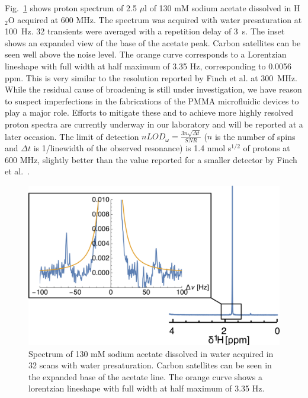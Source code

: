 \documentclass[preprint,5p]{elsarticle}
\newcommand{\fig}[1]{Fig.~\ref{#1}}
\begin{document}

\fig{fig:lineshape} shows proton spectrum of 2.5 $\mu$l of 130 mM  sodium acetate dissolved in H$_2$O acquired at 600 MHz. 
The spectrum was acquired with water presaturation at 100~Hz. 32 transients were averaged with a repetition delay
of 3~s. The inset shows an expanded view of the base of the acetate peak. Carbon satellites can be seen well above 
the noise level. The orange curve corresponds to a Lorentzian lineshape with full width at half maximum of 
3.35 Hz, corresponding to 0.0056 ppm. This is very similar to the resolution reported by Finch et al. at 300~MHz.
While the residual cause of broadening is still under investigation, we have reason to suspect imperfections
in the fabrications of the PMMA microfluidic devices to play a major role. Efforts to mitigate these and to
achieve more highly resolved proton spectra are currently underway in our laboratory and will be reported at a later
occasion.  The limit of detection $nLOD_{\omega}=\frac{3n\sqrt{{\Delta}t}}{SNR}$ ($n$ is the number of spins and $\Delta t$ is 1/linewidth of the observed resonance) is 
1.4 nmol s$^{1/2}$ of protons at 600 MHz, slightly better than the value reported for a 
smaller detector by Finch et al.~\cite{gream_2016}.

\begin{figure}
\centering
\includegraphics[width=.7\linewidth,keepaspectratio=true]{./figures/lineshape.png} 
\caption{Spectrum of 130 mM sodium acetate dissolved in water acquired in 32 scans with water presaturation. Carbon satellites can be seen in the expanded base of the acetate line. The orange curve shows a lorentzian lineshape with full width at half maximum of 3.35 Hz.}
\label{fig:lineshape} 
\end{figure}
\end{document}
